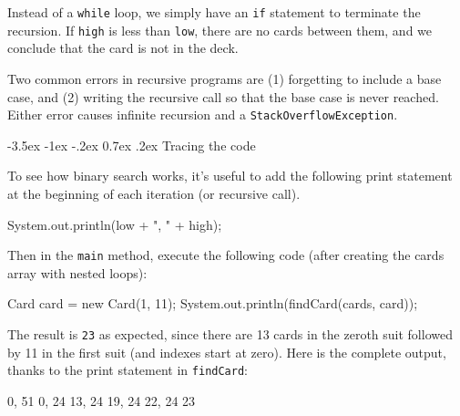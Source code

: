 \documentclass[12pt]{book}
\makeatletter
\theoremstyle{exercise}
\newcommand{\java}[1]{\verb"#1"}
\renewcommand{\section}{\@startsection {section}{1}{\z@}%
    {-3.5ex \@plus -1ex \@minus -.2ex}%
    {0.7ex \@plus.2ex}%
    {\normalfont\Large\bfseries}}
\newcommand{\java}[1]{\lstinline{#1}} %
\makeatother
\begin{document}

Instead of a \java{while} loop, we simply have an \java{if} statement to terminate the recursion.
If \java{high} is less than \java{low}, there are no cards between them, and we conclude that the card is not in the deck.


Two common errors in recursive programs are (1) forgetting to include a base case, and (2) writing the recursive call so that the base case is never reached.
Either error causes infinite recursion and a \java{StackOverflowException}.

\section{Tracing the code}

To see how binary search works, it's useful to add the following print statement at the beginning of each iteration (or recursive call).

\begin{code}
    System.out.println(low + ", " + high);
\end{code}


Then in the \java{main} method, execute the following code (after creating the cards array with nested loops):

\begin{code}
    Card card = new Card(1, 11);
    System.out.println(findCard(cards, card));
\end{code}

The result is \java{23} as expected, since there are 13 cards in the zeroth suit followed by 11 in the first suit (and indexes start at zero).
Here is the complete output, thanks to the print statement in \java{findCard}:

\begin{stdout}
0, 51
0, 24
13, 24
19, 24
22, 24
23
\end{stdout}
\end{document}
